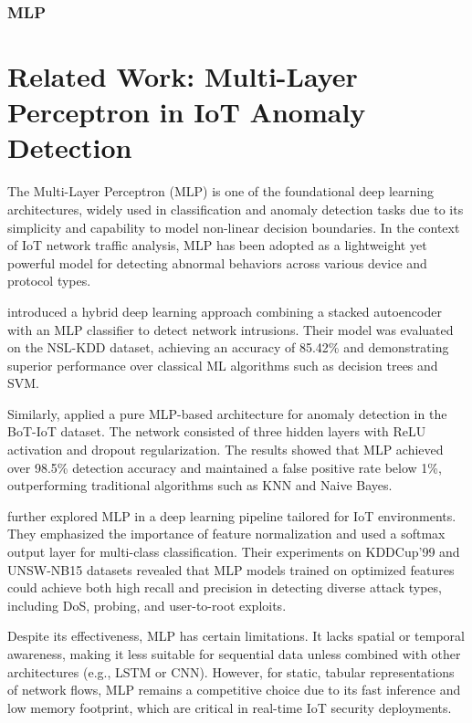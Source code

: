 \begin{ZhChapter}
\subsubsection{MLP}
\section{Related Work: Multi-Layer Perceptron in IoT Anomaly Detection}

The Multi-Layer Perceptron (MLP) is one of the foundational deep learning architectures, widely used in classification and anomaly detection tasks due to its simplicity and capability to model non-linear decision boundaries. In the context of IoT network traffic analysis, MLP has been adopted as a lightweight yet powerful model for detecting abnormal behaviors across various device and protocol types.

\citet{shone2018deep} introduced a hybrid deep learning approach combining a stacked autoencoder with an MLP classifier to detect network intrusions. Their model was evaluated on the NSL-KDD dataset, achieving an accuracy of 85.42\% and demonstrating superior performance over classical ML algorithms such as decision trees and SVM.

Similarly, \citet{rahman2020deep} applied a pure MLP-based architecture for anomaly detection in the BoT-IoT dataset. The network consisted of three hidden layers with ReLU activation and dropout regularization. The results showed that MLP achieved over 98.5\% detection accuracy and maintained a false positive rate below 1\%, outperforming traditional algorithms such as KNN and Naive Bayes.

\citet{javaid2016deep} further explored MLP in a deep learning pipeline tailored for IoT environments. They emphasized the importance of feature normalization and used a softmax output layer for multi-class classification. Their experiments on KDDCup'99 and UNSW-NB15 datasets revealed that MLP models trained on optimized features could achieve both high recall and precision in detecting diverse attack types, including DoS, probing, and user-to-root exploits.

Despite its effectiveness, MLP has certain limitations. It lacks spatial or temporal awareness, making it less suitable for sequential data unless combined with other architectures (e.g., LSTM or CNN). However, for static, tabular representations of network flows, MLP remains a competitive choice due to its fast inference and low memory footprint, which are critical in real-time IoT security deployments.


\end{ZhChapter}
